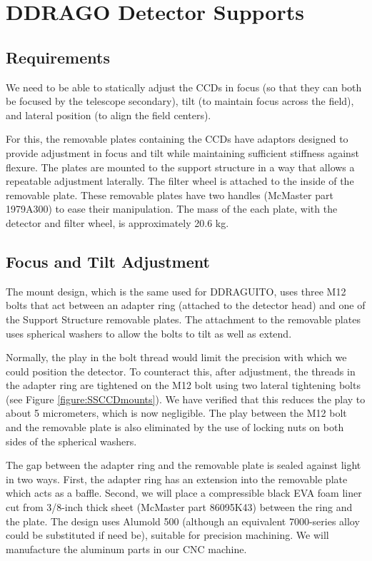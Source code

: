 \documentclass{report}
\begin{document}
\chapter{DDRAGO Detector Supports}


\section{Requirements}

We need to be able to statically adjust the CCDs in focus (so that they can both be focused by the telescope secondary), tilt (to maintain focus across the field), and lateral position (to align the field centers). 

For this, the removable plates containing the CCDs have adaptors designed to provide adjustment in focus and tilt while maintaining sufficient stiffness against flexure. The plates are mounted to the support structure in a way that allows a repeatable adjustment laterally. The filter wheel is attached to the inside of the removable plate. These removable plates have two handles (McMaster part 1979A300) to ease their manipulation. The mass of the each plate, with the detector and filter wheel, is approximately 20.6 kg.

\section{Focus and Tilt Adjustment}

The mount design, which is the same used for DDRAGUITO, uses three M12 bolts that act between an adapter ring (attached to the detector head) and one of the Support Structure removable plates. The attachment to the removable plates uses spherical washers to allow the bolts to tilt as well as extend.

Normally, the play in the bolt thread would limit the precision with which we could position the detector. To counteract this, after adjustment, the threads in the adapter ring are tightened on the M12 bolt using two lateral tightening bolts (see Figure \ref{figure:SSCCDmounts}). We have verified that this reduces the play to about 5 micrometers, which is now negligible. The play between the M12 bolt and the removable plate is also eliminated by the use of locking nuts on both sides of the spherical washers.

The gap between the adapter ring and the removable plate is sealed against light in two ways. First, the adapter ring has an extension into the removable plate which acts as a baffle. Second, we will place a compressible black EVA foam liner cut from 3/8-inch thick sheet (McMaster part 86095K43) between the ring and the plate. The design uses Alumold 500 (although an equivalent 7000-series alloy could be substituted if need be), suitable for precision machining. We will manufacture the aluminum parts in our CNC machine.
\end{document}
